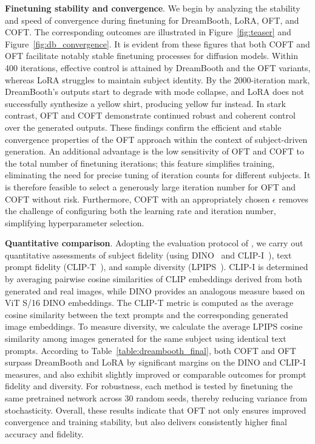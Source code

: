 \textbf{Finetuning stability and convergence}. We begin by analyzing the stability and speed of convergence during finetuning for DreamBooth, LoRA, OFT, and COFT. The corresponding outcomes are illustrated in Figure~\ref{fig:teaser} and Figure~\ref{fig:db_convergence}. It is evident from these figures that both COFT and OFT facilitate notably stable finetuning processes for diffusion models. Within 400 iterations, effective control is attained by DreamBooth and the OFT variants, whereas LoRA struggles to maintain subject identity. By the 2000-iteration mark, DreamBooth's outputs start to degrade with mode collapse, and LoRA does not successfully synthesize a yellow shirt, producing yellow fur instead. In stark contrast, OFT and COFT demonstrate continued robust and coherent control over the generated outputs. These findings confirm the efficient and stable convergence properties of the OFT approach within the context of subject-driven generation. An additional advantage is the low sensitivity of OFT and COFT to the total number of finetuning iterations; this feature simplifies training, eliminating the need for precise tuning of iteration counts for different subjects. It is therefore feasible to select a generously large iteration number for OFT and COFT without risk. Furthermore, COFT with an appropriately chosen $\epsilon$ removes the challenge of configuring both the learning rate and iteration number, simplifying hyperparameter selection.

\textbf{Quantitative comparison}. Adopting the evaluation protocol of \cite{ruiz2023dreambooth}, we carry out quantitative assessments of subject fidelity (using DINO~\cite{caron2021emerging} and CLIP-I~\cite{radford2021learning}), text prompt fidelity (CLIP-T~\cite{radford2021learning}), and sample diversity (LPIPS~\cite{zhang2018unreasonable}). CLIP-I is determined by averaging pairwise cosine similarities of CLIP embeddings derived from both generated and real images, while DINO provides an analogous measure based on ViT S/16 DINO embeddings. The CLIP-T metric is computed as the average cosine similarity between the text prompts and the corresponding generated image embeddings. To measure diversity, we calculate the average LPIPS cosine similarity among images generated for the same subject using identical text prompts. According to Table~\ref{table:dreambooth_final}, both COFT and OFT surpass DreamBooth and LoRA by significant margins on the DINO and CLIP-I measures, and also exhibit slightly improved or comparable outcomes for prompt fidelity and diversity. For robustness, each method is tested by finetuning the same pretrained network across 30 random seeds, thereby reducing variance from stochasticity. Overall, these results indicate that OFT not only ensures improved convergence and training stability, but also delivers consistently higher final accuracy and fidelity.

